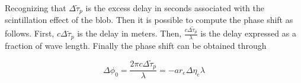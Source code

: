 Recognizing that $\Delta \tilde{\tau}_p$ is the excess delay in seconds associated
with the scintillation effect of the blob. Then it is possible to compute the
phase shift as follows. First, $c \Delta \tilde{\tau}_p$ is the delay in meters.
Then, $\frac{c \Delta \tilde{\tau}_p}{\lambda}$ is the delay expressed as
a fraction of wave length. Finally the phase shift can be obtained through

\begin{equation*}
	\Delta \phi_0 = \frac{2 \pi c \Delta \tilde{\tau}_p}{\lambda}
	= - a r_e \Delta \eta_e \lambda
\end{equation*}

